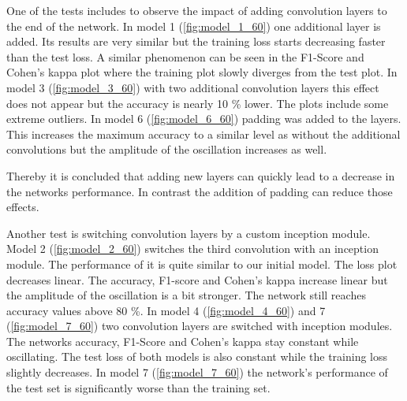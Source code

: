 \documentclass[
a4paper, 
12pt,
grayscalebody, %
abstract=on,
twoside, BCOR10mm, 12pt, DIV13,headinclude, footexclude, final, abstracton, openright
]{ibireprt}
\numberwithin{equation}{chapter}
\numberwithin{table}{chapter}
\numberwithin{figure}{chapter}
\numberwithin{algorithm}{chapter}
\numberwithin{example}{chapter}
\numberwithin{example}{chapter}
\begin{document}
\clearpage

One of the tests includes to observe the impact of adding convolution layers to the end of the network. In model 1 (\ref{fig:model_1_60}) one additional layer is added. Its results are very similar but the training loss starts decreasing faster than the test loss. A similar phenomenon can be seen in the F1-Score and Cohen's kappa plot where the training plot slowly diverges from the test plot. In model 3 (\ref{fig:model_3_60}) with two additional convolution layers this effect does not appear but the accuracy is nearly 10 \% lower. The plots include some extreme outliers. In model 6 (\ref{fig:model_6_60}) padding was added to the layers. This increases the maximum accuracy to a similar level as without the additional convolutions but the amplitude of the oscillation increases as well.

Thereby it is concluded that adding new layers can quickly lead to a decrease in the networks performance. In contrast the addition of padding can reduce those effects. 

\begin{figure}
\end{figure}
Another test is switching convolution layers by a custom inception module. Model 2 (\ref{fig:model_2_60}) switches the third convolution with an inception module. The performance of it is quite similar to our initial model. The loss plot decreases linear. The accuracy, F1-score and Cohen's kappa increase linear but the amplitude of the oscillation is a bit stronger. The network still reaches accuracy values above 80 \%.
In model 4 (\ref{fig:model_4_60}) and 7 (\ref{fig:model_7_60}) two convolution layers are switched with inception modules. The networks accuracy, F1-Score and Cohen's kappa stay constant while oscillating. The test loss of both models is also constant while the training loss slightly decreases. In model 7 (\ref{fig:model_7_60}) the network's performance of the test set is significantly worse than the training set.
\end{document}
